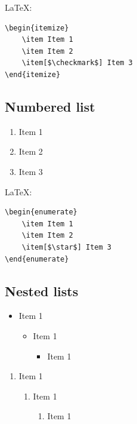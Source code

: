 \documentclass[12pt,nonacm,acmlarge,titlepage,screen]{acmart}
\begin{document}
\noindent\LaTeX:
\begin{Verbatim}[frame=single]
\begin{itemize}
    \item Item 1
    \item Item 2
    \item[$\checkmark$] Item 3 
\end{itemize}
\end{Verbatim}

\subsection*{Numbered list}

\begin{enumerate}
    \item Item 1
    \item Item 2
    \item[$\star$] Item 3
\end{enumerate}

\noindent\LaTeX:
\begin{Verbatim}[frame=single]
\begin{enumerate}
    \item Item 1
    \item Item 2
    \item[$\star$] Item 3
\end{enumerate}
\end{Verbatim}

\subsection*{Nested lists}

\begin{itemize}
    \item Item 1
    \begin{itemize}
        \item Item 1
        \begin{itemize}
            \item Item 1
        \end{itemize}
    \end{itemize}
\end{itemize}
\begin{enumerate}
    \item Item 1
    \begin{enumerate}
        \item Item 1
        \begin{enumerate}
            \item Item 1
        \end{enumerate}
    \end{enumerate}
\end{enumerate}
\end{document}
